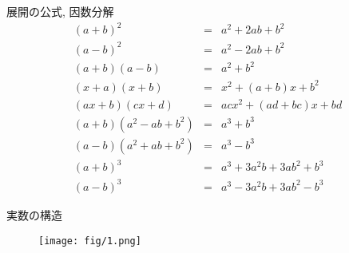 \documentclass[aspectratio=169, 12pt]{beamer}
\begin{document}
\begin{frame}{展開の公式, 因数分解}
    \begin{eqnarray*}
        (a+b)^2&=&a^2+2ab+b^2 \\
        (a-b)^2&=&a^2-2ab+b^2 \\
        (a+b)(a-b)&=&a^2+b^2 \\
        (x+a)(x+b)&=&x^2+(a+b)x+b^2 \\
        (ax+b)(cx+d)&=&acx^2+(ad+bc)x+bd \\
        (a+b)(a^2-ab+b^2)&=&a^3+b^3 \\
        (a-b)(a^2+ab+b^2)&=&a^3-b^3 \\
        (a+b)^3&=&a^3+3a^2b+3ab^2+b^3 \\
        (a-b)^3&=&a^3-3a^2b+3ab^2-b^3
    \end{eqnarray*}
\end{frame}
\begin{frame}{実数の構造}
    \begin{figure}[htbp]
        \begin{center}
            \texttt{[image: fig/1.png]}
        \end{center}
    \end{figure}
\end{frame}
\end{document}
